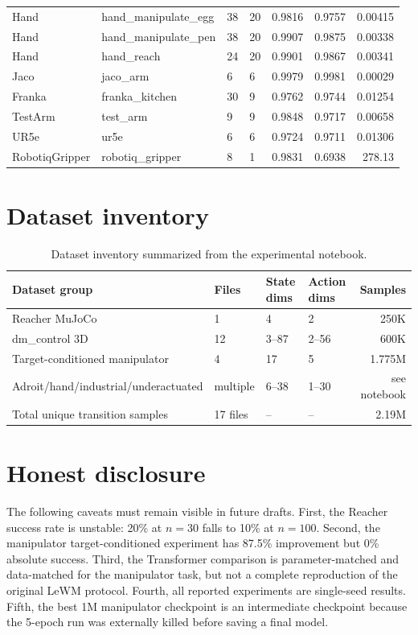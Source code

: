 \documentclass[10pt]{article}
\begin{document}
\begin{longtable}{llllrrr}
Hand & hand\_manipulate\_egg & 38 & 20 & 0.9816 & 0.9757 & 0.00415 \\
Hand & hand\_manipulate\_pen & 38 & 20 & 0.9907 & 0.9875 & 0.00338 \\
Hand & hand\_reach & 24 & 20 & 0.9901 & 0.9867 & 0.00341 \\
Jaco & jaco\_arm & 6 & 6 & 0.9979 & 0.9981 & 0.00029 \\
Franka & franka\_kitchen & 30 & 9 & 0.9762 & 0.9744 & 0.01254 \\
TestArm & test\_arm & 9 & 9 & 0.9848 & 0.9717 & 0.00658 \\
UR5e & ur5e & 6 & 6 & 0.9724 & 0.9711 & 0.01306 \\
RobotiqGripper & robotiq\_gripper & 8 & 1 & 0.9831 & 0.6938 & 278.13 \\
\end{longtable}

\section{Dataset inventory}

\begin{table}[h]
\centering
\caption{Dataset inventory summarized from the experimental notebook.}
\small
\begin{tabular}{llllr}
\toprule
Dataset group & Files & State dims & Action dims & Samples \\
\midrule
Reacher MuJoCo & 1 & 4 & 2 & 250K \\
dm\_control 3D & 12 & 3--87 & 2--56 & 600K \\
Target-conditioned manipulator & 4 & 17 & 5 & 1.775M \\
Adroit/hand/industrial/underactuated & multiple & 6--38 & 1--30 & see notebook \\
\midrule
Total unique transition samples & 17 files & -- & -- & 2.19M \\
\bottomrule
\end{tabular}
\end{table}

\section{Honest disclosure}

The following caveats must remain visible in future drafts. First, the Reacher success rate is unstable: 20\% at $n=30$ falls to 10\% at $n=100$. Second, the manipulator target-conditioned experiment has 87.5\% improvement but 0\% absolute success. Third, the Transformer comparison is parameter-matched and data-matched for the manipulator task, but not a complete reproduction of the original LeWM protocol. Fourth, all reported experiments are single-seed results. Fifth, the best 1M manipulator checkpoint is an intermediate checkpoint because the 5-epoch run was externally killed before saving a final model.
\end{document}
